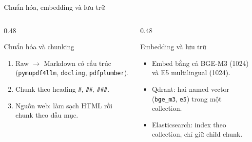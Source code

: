 \documentclass[t, aspectratio=169]{beamer}
\begin{document}
	\begin{frame}{Chuẩn hóa, embedding và lưu trữ}
		\begin{columns}[T,onlytextwidth]
			\begin{column}{0.48\textwidth}
				\begin{block}{Chuẩn hóa và chunking}
					\begin{enumerate}
						\item Raw $\rightarrow$ Markdown có cấu trúc (\texttt{pymupdf4llm}, \texttt{docling}, \texttt{pdfplumber}).
						\item Chunk theo heading \texttt{\#}, \texttt{\#\#}, \texttt{\#\#\#}.
						\item Nguồn web: làm sạch HTML rồi chunk theo đầu mục.
					\end{enumerate}
				\end{block}
			\end{column}
			\begin{column}{0.48\textwidth}
				\begin{block}{Embedding và lưu trữ}
					\begin{itemize}
						\item Embed bằng cả BGE-M3 (1024) và E5 multilingual (1024).
						\item Qdrant: hai named vector (\texttt{bge\_m3}, \texttt{e5}) trong một collection.
						\item Elasticsearch: index theo collection, chỉ giữ child chunk.
					\end{itemize}
				\end{block}
			\end{column}
		\end{columns}
	\end{frame}
\end{document}
